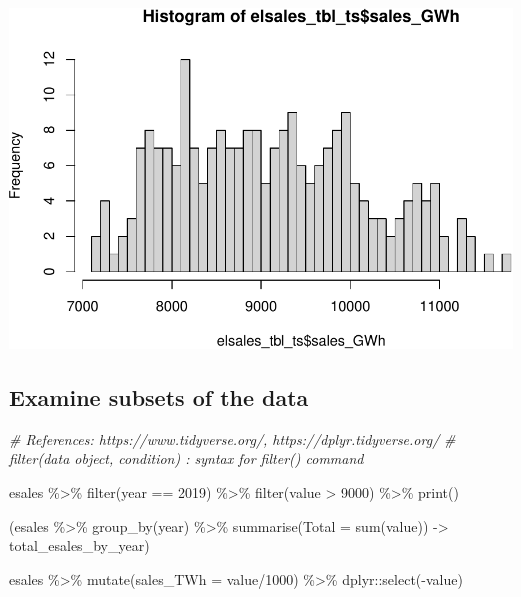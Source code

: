 \documentclass[
]{book}
\newenvironment{Shaded}{\begin{snugshade}}{\end{snugshade}}
\newcommand{\AttributeTok}[1]{\textcolor[rgb]{0.77,0.63,0.00}{#1}}
\newcommand{\CommentTok}[1]{\textcolor[rgb]{0.56,0.35,0.01}{\textit{#1}}}
\newcommand{\DecValTok}[1]{\textcolor[rgb]{0.00,0.00,0.81}{#1}}
\newcommand{\FunctionTok}[1]{\textcolor[rgb]{0.00,0.00,0.00}{#1}}
\newcommand{\NormalTok}[1]{#1}
\newcommand{\OtherTok}[1]{\textcolor[rgb]{0.56,0.35,0.01}{#1}}
\newcommand{\SpecialCharTok}[1]{\textcolor[rgb]{0.00,0.00,0.00}{#1}}
\begin{document}
\includegraphics{graphics/make basic data summaries-2.pdf}

\hypertarget{examine-subsets-of-the-data}{%
\subsection{Examine subsets of the data}\label{examine-subsets-of-the-data}}

\begin{Shaded}
\begin{Highlighting}[]
\CommentTok{\# References: https://www.tidyverse.org/, https://dplyr.tidyverse.org/}
\CommentTok{\# filter(data object, condition) : syntax for filter() command}

\NormalTok{esales }\SpecialCharTok{\%\textgreater{}\%}
  \FunctionTok{filter}\NormalTok{(year }\SpecialCharTok{==} \DecValTok{2019}\NormalTok{) }\SpecialCharTok{\%\textgreater{}\%}
  \FunctionTok{filter}\NormalTok{(value }\SpecialCharTok{\textgreater{}} \DecValTok{9000}\NormalTok{) }\SpecialCharTok{\%\textgreater{}\%}
  \FunctionTok{print}\NormalTok{()}

\NormalTok{(esales }\SpecialCharTok{\%\textgreater{}\%}
  \FunctionTok{group\_by}\NormalTok{(year) }\SpecialCharTok{\%\textgreater{}\%}
  \FunctionTok{summarise}\NormalTok{(}\AttributeTok{Total =} \FunctionTok{sum}\NormalTok{(value)) }\OtherTok{{-}\textgreater{}}\NormalTok{ total\_esales\_by\_year)}

\NormalTok{esales }\SpecialCharTok{\%\textgreater{}\%}
  \FunctionTok{mutate}\NormalTok{(}\AttributeTok{sales\_TWh =}\NormalTok{ value}\SpecialCharTok{/}\DecValTok{1000}\NormalTok{) }\SpecialCharTok{\%\textgreater{}\%}
\NormalTok{  dplyr}\SpecialCharTok{::}\FunctionTok{select}\NormalTok{(}\SpecialCharTok{{-}}\NormalTok{value)}
\end{Highlighting}
\end{Shaded}
\end{document}
